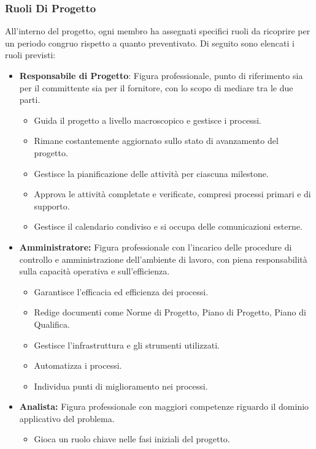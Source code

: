 \documentclass{article}
\begin{document}
\subsubsection{Ruoli Di Progetto}
All'interno del progetto, ogni membro ha assegnati specifici ruoli da ricoprire per un periodo congruo rispetto a quanto preventivato. Di seguito sono elencati i ruoli previsti:
\begin{itemize}
    \item \textbf{Responsabile di Progetto}:
        Figura professionale, punto di riferimento sia per il committente sia per il fornitore, con lo scopo di mediare tra le due parti.
        \begin{itemize}
            \item Guida il progetto a livello macroscopico e gestisce i processi.
            \item  Rimane costantemente aggiornato sullo stato di avanzamento del progetto.
            \item Gestisce la pianificazione delle attività per ciascuna milestone.
            \item Approva le attività completate e verificate, compresi processi primari e di supporto.
            \item Gestisce il calendario condiviso e si occupa delle comunicazioni esterne.
        \end{itemize}
    \item \textbf{Amministratore:}
        Figura professionale con l’incarico delle procedure di controllo e amministrazione dell’ambiente di lavoro, con piena responsabilità sulla capacità operativa e sull’efficienza.
        \begin{itemize}
            \item Garantisce l'efficacia ed efficienza dei processi.
            \item Redige documenti come Norme di Progetto, Piano di Progetto, Piano di Qualifica.
            \item Gestisce l'infrastruttura e gli strumenti utilizzati.
            \item Automatizza i processi.
            \item Individua punti di miglioramento nei processi.
        \end{itemize}
    \item \textbf{Analista:}
        Figura professionale con maggiori competenze riguardo il dominio applicativo del problema.
        \begin{itemize}
            \item Gioca un ruolo chiave nelle fasi iniziali del progetto.

\end{itemize}
\end{itemize}
\end{document}
